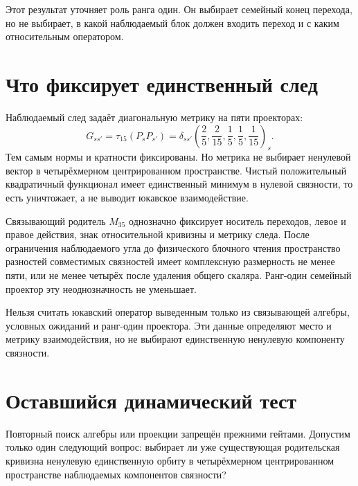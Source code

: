 Этот результат уточняет роль ранга один. Он выбирает семейный конец
перехода, но не выбирает, в какой наблюдаемый блок должен входить переход и
с каким относительным оператором.

\section{Что фиксирует единственный след}

Наблюдаемый след задаёт диагональную метрику на пяти проекторах:
\begin{equation}
 G_{ss'}=\tau_{15}(P_sP_{s'})
 =\delta_{ss'}\left(\frac25,\frac2{15},\frac15,
 \frac15,\frac1{15}\right)_s.
 \label{eq:v5-observed-connection-metric}
\end{equation}
Тем самым нормы и кратности фиксированы. Но метрика не выбирает ненулевой
вектор в четырёхмерном центрированном пространстве. Чистый положительный
квадратичный функционал имеет единственный минимум в нулевой связности, то
есть уничтожает, а не выводит юкавское взаимодействие.

\begin{theorem}
Связывающий родитель $M_{35}$ однозначно фиксирует носитель переходов,
левое и правое действия, знак относительной кривизны и метрику следа. После
ограничения наблюдаемого угла до физического блочного чтения пространство
разностей совместимых связностей имеет комплексную размерность не менее
пяти, или не менее четырёх после удаления общего скаляра. Ранг-один
семейный проектор эту неоднозначность не уменьшает.
\end{theorem}

\begin{nogocriterion}
Нельзя считать юкавский оператор выведенным только из связывающей алгебры,
условных ожиданий и ранг-один проектора. Эти данные определяют место и
метрику взаимодействия, но не выбирают единственную ненулевую компоненту
связности.
\end{nogocriterion}

\section{Оставшийся динамический тест}

Повторный поиск алгебры или проекции запрещён прежними гейтами. Допустим
только один следующий вопрос: выбирает ли уже существующая родительская
кривизна ненулевую единственную орбиту в четырёхмерном центрированном
пространстве наблюдаемых компонентов связности?

